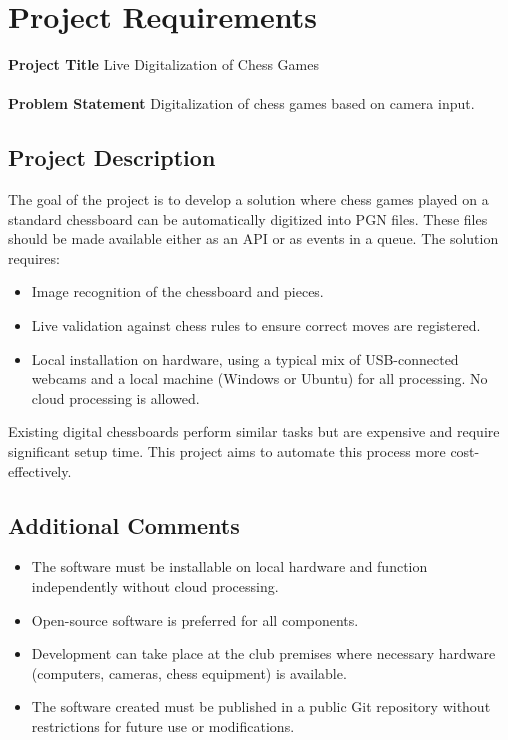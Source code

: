 \chapter*{Project Requirements}
\textbf{Project Title} Live Digitalization of Chess Games\\\\
\textbf{Problem Statement} Digitalization of chess games based on camera input.

\section*{Project Description}
The goal of the project is to develop a solution where chess games played on a standard chessboard can be automatically digitized into PGN files. These files should be made available either as an API or as events in a queue. The solution requires:
\begin{itemize}
    \item Image recognition of the chessboard and pieces.
    \item Live validation against chess rules to ensure correct moves are registered.
    \item Local installation on hardware, using a typical mix of USB-connected webcams and a local machine (Windows or Ubuntu) for all processing. No cloud processing is allowed.
\end{itemize}

Existing digital chessboards perform similar tasks but are expensive and require significant setup time. This project aims to automate this process more cost-effectively.

\section*{Additional Comments}
\begin{itemize}
    \item The software must be installable on local hardware and function independently without cloud processing.
    \item Open-source software is preferred for all components.
    \item Development can take place at the club premises where necessary hardware (computers, cameras, chess equipment) is available.
    \item The software created must be published in a public Git repository without restrictions for future use or modifications.
\end{itemize}